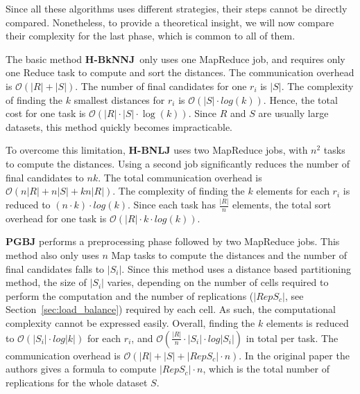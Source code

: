 \documentclass[10pt,journal,compsoc]{IEEEtran}
\newcommand{\TODO}[1]{\textcolor{red}{\textbf{[TODO:#1]}}}
\newcommand{\VO}{{\bf PGBJ}}
\newcommand{\HBNLJ}{{\bf H-BNLJ}}
\newcommand{\HBK}{{\bf H-BkNNJ}}
\begin{document}
Since all these algorithms uses different strategies, their steps cannot be directly compared. Nonetheless,
to provide a theoretical insight, we will now compare their complexity for the last phase, which is common to all of 
them. 


The basic method \HBK~only uses one MapReduce job, and requires  
only one Reduce task to compute and sort the distances. The communication overhead is $\mathcal{O} 
(\left|R\right|+\left|S\right|)$. The number of final candidates for one $r_i$ is $|S|$. The complexity of finding the 
$k$ smallest distances for $r_i$ is $\mathcal{O}(
\left|S\right| \cdot log\left(k\right))$. Hence, the total cost for one task is $\mathcal{O}(\left|R\right| 
\cdot \left|S\right| \cdot \log\left(k\right))$. Since $R$ and $S$ are usually large 
datasets, this method quickly becomes impracticable.

To overcome this limitation,  {\bf \HBNLJ}  \cite{Zhang:2012:EPK:2247596.2247602} uses two MapReduce jobs, with $n^2$  
tasks 
to compute the distances.
Using a second  job significantly reduces the number of final candidates to $nk$. 
The total communication overhead is $\mathcal{O}(n\left|R\right|+n\left|S\right|+kn\left|R\right|)$. The 
complexity of finding the $k$ elements for each $r_i$ is reduced to $\left(n \cdot k
\right) \cdot log\left(k\right)$. Since each task has $\frac{\left|R\right|}{n}$ elements, the total sort overhead for 
one task is $\mathcal{O}(\left|R\right| \cdot k \cdot log(k))$.


{\bf \VO} \cite{Lu:2012:EPK:2336664.2336674} performs a preprocessing phase followed by two MapReduce jobs. This method 
also 
only uses $n$ Map tasks to compute the distances and the number of final candidates falls to $|S_i|$. Since this method 
uses a distance based partitioning method, 
the size of $|S_i|$ varies, depending on the number of cells
required to perform the computation and the number of replications ($\left|RepS_c\right|$, see 
Section~\ref{sec:load_balance}) required by each cell. As 
such, the computational complexity cannot be expressed easily.%
Overall, finding
the $k$ elements is reduced to $\mathcal{O}(\left|S_i\right| \cdot log\left|k\right|)$ for each $r_i$, and 
$\mathcal{O}(\frac{\left|R\right|}{n} \cdot \left|S_i\right| \cdot log\left|S_i\right|)$ in total per task.
 The communication overhead is $\mathcal{O}(\left|R\right| + \left|S\right| + \left|RepS_c\right|\cdot n)$. In the 
 original 
paper the authors gives a formula to compute $\left|RepS_c\right|\cdot n$, which is the total number of 
replications for the whole dataset $S$. %
\end{document}
